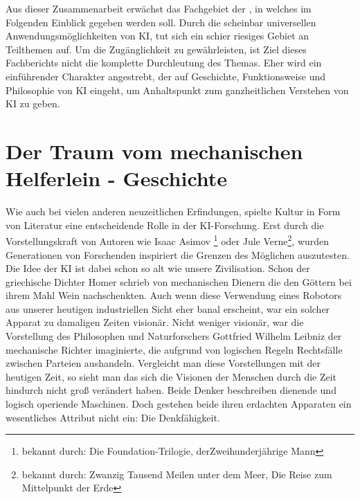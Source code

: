 \documentclass[12pt,german,ngerman]{report}
\begin{document}
    Aus dieser Zusammenarbeit erwächst das Fachgebiet der , in welches
    im Folgenden Einblick gegeben werden soll.
    Durch die scheinbar universellen Anwendungsmöglichkeiten von KI, tut sich ein schier riesiges Gebiet an Teilthemen auf.
    Um die Zugänglichkeit zu gewährleisten, ist Ziel dieses Fachberichts nicht die komplette Durchleutung
    des Themas. Eher wird ein einführender Charakter angestrebt,
    der auf Geschichte, Funktionsweise und Philosophie von KI eingeht,
    um Anhaltspunkt zum ganzheitlichen Verstehen von KI zu geben.
    

\chapter{Der Traum vom mechanischen Helferlein - Geschichte}

    Wie auch bei vielen anderen neuzeitlichen Erfindungen, spielte Kultur in Form von Literatur eine entscheidende Rolle
    in der KI-Forschung. Erst durch die Vorstellungskraft von Autoren wie Isaac Asimov
    \footnote{bekannt durch: Die Foundation-Trilogie, derZweihunderjährige Mann}
    oder Jule Verne\footnote{bekannt durch: Zwanzig Tausend Meilen unter dem Meer, Die Reise zum Mittelpunkt der Erde}, 
    wurden Generationen von Forschenden inspiriert die Grenzen des Möglichen auszutesten. 
    Die Idee der KI ist dabei schon so alt wie unsere Zivilisation. 
    Schon der griechische Dichter Homer schrieb von mechanischen Dienern die den Göttern bei ihrem Mahl
    Wein nachschenkten\cite[53]{buchanan2005very}. Auch wenn diese Verwendung eines Robotors aus unserer heutigen
    industriellen Sicht eher banal erscheint, war ein solcher Apparat zu damaligen Zeiten visionär.
    Nicht weniger visionär, war die Vorstellung des Philosophen und Naturforschers Gottfried Wilhelm Leibniz der mechanische
    Richter imaginierte, die aufgrund von logischen Regeln Rechtsfälle zwischen Parteien aushandeln\cite[53]{buchanan2005very}.
    Vergleicht man diese Vorstellungen mit der heutigen Zeit, so sieht man das sich die Visionen der Menschen durch die Zeit hindurch
    nicht groß verändert haben. Beide Denker beschreiben dienende und logisch operiende Maschinen.
    Doch gestehen beide ihren erdachten Apparaten ein wesentliches Attribut nicht ein: Die Denkfähigkeit. 
\end{document}
